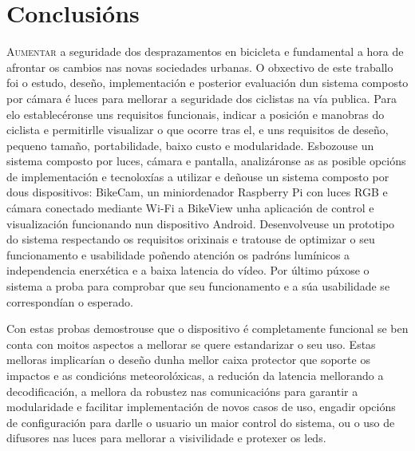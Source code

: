 \chapter{Conclusións}
\label{chap:conclusions}

\lettrine{A}{umentar} a seguridade dos desprazamentos en bicicleta e fundamental a hora de afrontar os cambios nas novas sociedades urbanas. O obxectivo de este traballo  foi o estudo, deseño, implementación e posterior evaluación dun sistema composto por cámara é luces para mellorar a seguridade dos ciclistas na vía publica. Para elo establecéronse uns requisitos funcionais, indicar a posición e manobras do ciclista e permitirlle visualizar o que ocorre tras el, e uns requisitos de deseño, pequeno tamaño, portabilidade, baixo custo e modularidade. Esbozouse un sistema composto por luces, cámara e pantalla, analizáronse as as posible opcións de implementación e tecnoloxías a utilizar e deñouse un sistema composto por dous dispositivos: BikeCam, un miniordenador Raspberry Pi con luces RGB e cámara conectado mediante Wi-Fi a BikeView unha aplicación de control e visualización funcionando nun dispositivo Android. Desenvolveuse un prototipo do sistema respectando os requisitos orixinais e tratouse de optimizar o seu funcionamento e usabilidade poñendo atención os padróns lumínicos a independencia enerxética e a baixa latencia do vídeo. Por último púxose o sistema a proba para comprobar que seu funcionamento e a súa usabilidade se correspondían o esperado.

Con estas probas demostrouse que o dispositivo é completamente funcional se ben conta con moitos aspectos a mellorar se quere estandarizar o seu uso. Estas melloras implicarían o deseño dunha mellor caixa protector que soporte os impactos e as condicións meteorolóxicas, a redución da latencia mellorando a decodificación, a mellora da robustez nas comunicacións para garantir a modularidade e facilitar implementación de novos casos de uso, engadir opcións de configuración para darlle o usuario un maior control do sistema, ou o uso de difusores nas luces para mellorar a visivilidade e protexer os leds.

